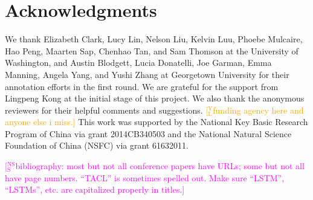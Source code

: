 \documentclass[11pt,a4paper]{article}
\newcommand{\yjcomment}[1]{\textcolor{orange}{[$_\mathrm{L}^\mathrm{Y}$#1]}}
\newcommand{\nss}[1]{\textcolor{magenta}{[$_\mathrm{S}^\mathrm{NS}$#1]}}
\begin{document}
\section*{Acknowledgments}
We thank Elizabeth Clark, Lucy Lin, Nelson Liu, Kelvin Luu, Phoebe Mulcaire, 
Hao Peng, Maarten Sap, Chenhao Tan, and Sam Thomson at the University of Washington, 
and Austin Blodgett, Lucia Donatelli, Joe Garman, Emma Manning, Angela Yang, and Yushi Zhang 
at Georgetown University for their annotation efforts in the first round.
We are grateful for the support from Lingpeng Kong at the initial stage of this project.
We also thank the anonymous reviewers for their helpful comments and suggestions.
\yjcomment{funding agency here and anyone else i miss.}
This work was supported by the National Key Basic Research
Program of China via grant 2014CB340503 and the
National Natural Science Foundation of China (NSFC) via
grant 61632011.

\nss{bibliography: most but not all conference papers have URLs; some but not all have page numbers. 
``TACL'' is sometimes spelled out.
Make sure ``LSTM'', ``LSTMs'', etc. are capitalized properly in titles.}



\end{document}
